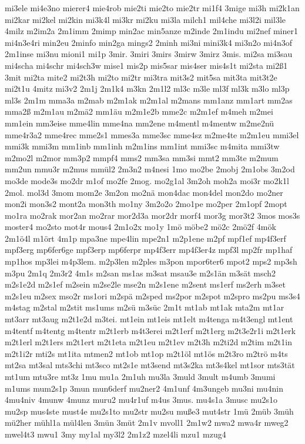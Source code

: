 {mi3ele
mi4e3no
mierer4
mie4rob
mie2ti
mie2to
mie2tr
mi1f4
3mige
mi3h
mi2k1an
mi2kar
mi2kel
mi2kin
mi3k4l
mi3kr
mi2ku
mi3la
milch1
mil4che
mi3l2i
mil3le
4milz
m2im2a
2m1imm
2mimp
min2ac
min5anze
m2inde
2m1indu
mi2nef
miner1
mi4n3e4ri
min2eu
2minfo
min2ga
mings2
2minh
mi3ni
mini3k4
mi3n2o
mi4n3of
2m1inse
mi3nu
mioni1
mi1p
3mir.
3miri
3mirs
3mirw
3mirz
3mis.
mi2sa
mi3sau
mi4scha
mi4schr
mi4sch3w
mise1
mis2p
mis5sar
mis4ser
mis4s1t
mi2sta
mi2ß1
3mit
mi2ta
mite2
mi2t3h
mi2to
mi2tr
mi3tra
mit3s2
mit5sa
mit3ta
mit3t2e
mi2t1u
4mitz
mi3v2
2m1j
2m1k4
m3kn
2m1l2
ml3c
m3le
ml3f
ml3k
m3lo
ml3p
ml3s
2m1m
mma3a
m2mab
m2m1ak
m2m1al
m2mans
mm1anz
mm1art
mm2as
mma2ß
m2m1au
m2mä2
mm1äu
m2m1e2b
mme2c
m2m1ef
m4meh
m2mei
mm1ein
mm3eise
mme4lin
mme4na
mm2ene
m4mentl
m4mentw
m2me2nü
mme4r3a2
mme4rec
mme2s1
mmes3a
mme3sc
mme4sz
m2me4te
m2m1eu
mmi3el
mmi3k
mmi3m
mm1inb
mm1inh
m2m1ins
mm1int
mmi3sc
m4mita
mmi3tw
m2mo2l
m2mor
mm3p2
mmpf4
mms2
mm3sa
mm3si
mmt2
mm3te
m2mum
mm2un
mmu3r
m2mus
mmül2
2m3n2
m4nesi
1mo
mo2be
2mobj
2m1obs
3m2od
mo3de
mode3s
mo2dr
m1of
mo2fe
2mog.
mo2g1al
3m2oh
moh2a
moi3r
mo2k1l
2mol.
mol3d
3mom
mom2e
3m2on
mo2nä
mon4dac
mon4del
mon2do
mo2ner
mon2i
mon3s2
mont2a
mon3th
mo1ny
3m2o2o
2mo1pe
mo2per
2m1opf
2mopt
mo1ra
mo2rak
mor2an
mo2rar
mor2d3a
mor2dr
morf4
mor3g
mor3t2
3mos
mos3s
moster4
mo2sto
mot4r
mous4
2m1o2x
mo1y
1mö
möbe2
mö2c
2mö2f
4mök
2m1ö4l
m1ört
4m1p
mpa3ne
mpe4lin
mpe2n1
m2p1ene
m2pf
mpf1ef
mp4f3erf
mpf3erg
mp6fer6ge
mpf3erp
mp6ferpr
mp4f3err
mp4f3er4z
mpf3l
mp2fr
mp1haf
mp1hos
mp3lei
m4p3lem.
m2p3len
m2ples
m3pon
mpor6ter6
mpot2
mps2
mp3sh
m3pu
2m1q
2m3r2
4m1s
m2san
ms1as
m3sat
msau3e
m2s1än
m3sät
msch2
m2s1e2d
m2s1ef
m2sein
m2se2le
mse2n
m2s1ene
m2sent
ms1erf
ms2erh
m3set
m2s1eu
m2sex
mso2r
ms1ori
m2spä
m2sped
ms2por
m2spot
m2spro
ms2pu
ms3s4
m4stag
m2stal
m2stit
ms1ums
m2sü
m3süc
2m1t
mt1ab
mt1ak
mta2m
mt1ar
mt3arr
mt3aug
m2t1e2d
m3tei.
mt1ein
mt1eis
mt1elt
m4tenga
m4t3engl
mt1ent
m4tentf
m4tentg
m4tentr
m2t1erb
m4t3erei
m2t1erf
m2t1erg
m2t3e2r1i
m2t1erk
m2t1erl
m2t1ers
m2t1ert
m2t1eta
m2t1eu
m2t1ev
m2t3h
m2ti2d
m2tim
m2t1in
m2t1i2r
mti2s
mt1ita
mtmen2
mt1ob
mt1op
m2t1öl
mt1ös
m2t3ro
m2trö
m4ts
mt2sa
mt3sal
mts3chi
mt3sco
mt2s1e
mt3send
mt3s2ka
mt3s4kel
mt1sor
mts3tät
mt1um
mtu3re
mt3z
1mu
mu1a
2m1uh
mu3la
3muld
3mult
m4umb
3mumi
m1ums
mum2s1p
3mun
mun6derf
mu2ner2
4m1unf
4m3ungeb
mu3ni
mu4nin
4mu4niv
4munw
4munz
muru2
mu4r1uf
m4us
3mus.
mu4s1a
3musc
mu2s1o
mu2sp
mus4ste
must4e
mu2s1to
mu2str
mu2su
muße3
mut4str
1mü
2müb
3müh
mü2her
mühl1a
mül4len
3mün
3müt
2m1v
mvoll1
2m1w2
mwa2
mwa4r
mweg2
mwel4t3
mwu1
3my
my1al
my3l2
2m1z2
mzel4li
mzu1
mzug4
}

